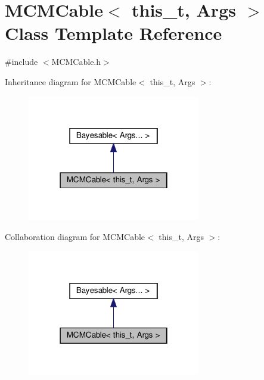 \hypertarget{class_m_c_m_cable}{}\section{M\+C\+M\+Cable$<$ this\+\_\+t, Args $>$ Class Template Reference}
\label{class_m_c_m_cable}


{\ttfamily \#include $<$M\+C\+M\+Cable.\+h$>$}



Inheritance diagram for M\+C\+M\+Cable$<$ this\+\_\+t, Args $>$\+:
\nopagebreak
\begin{figure}[H]
\begin{center}
\leavevmode
\includegraphics[width=214pt]{class_m_c_m_cable__inherit__graph}
\end{center}
\end{figure}


Collaboration diagram for M\+C\+M\+Cable$<$ this\+\_\+t, Args $>$\+:
\nopagebreak
\begin{figure}[H]
\begin{center}
\leavevmode
\includegraphics[width=214pt]{class_m_c_m_cable__coll__graph}
\end{center}
\end{figure}
